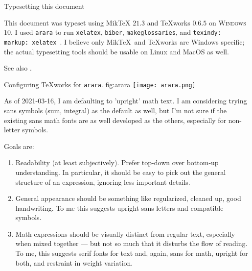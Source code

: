 \begin{plSection}{Typesetting this document}

This document was typeset using Mik\TeX{} $21.3$ 
\cite{Schenk:2017:Miktex} 
and {\TeX}works $0.6.5$ \cite{KewLoffler:2017:Texworks} 
on \textsc{Windows} $10$. 
I used \texttt{arara} \cite{CeredaEtAl:2021:Arara} 
to run \texttt{xelatex}, \texttt{biber}, \texttt{makeglossaries},  
and
\texttt{texindy: { markup: xelatex }}.
I believe only Mik\TeX\  and {\TeX}works are Windows specific; 
the actual typesetting tools should be usable on Linux and MacOS 
as well.

See also \cite{Talbot:2012:LatexNovices,Talbot:2013:LatexPhD}.

\begin{plScreen}
{Configuring {\TeX}works for \texttt{arara}.}
{fig:arara}
\centering
\texttt{[image: arara.png]}
\end{plScreen}

As of 2021-03-16, I am defaulting to 'upright' math text.
I am considering trying sans symbols (sum, integral) 
as the default as well,
but I'm not sure if the existing sans math fonts are as well
developed as the others, especially for non-letter symbols.

Goals are:
\begin{enumerate}
\item Readability (at least subjectively). Prefer top-down over
    bottom-up understanding. In particular, it should be easy to
    pick out the general structure of an expression, ignoring
    less important details.

\item General appearance should be something like regularized,
    cleaned up, good handwriting. To me this suggests upright
    sans letters and compatible symbols.

\item Math expressions should be visually distinct from regular
    text, especially when mixed together --- but not so much
    that it disturbs the flow of reading. To me, this suggests
    serif fonts for text and, again, sans for math, upright
    for both, and restraint in weight variation.
\end{enumerate}


\end{plSection}
